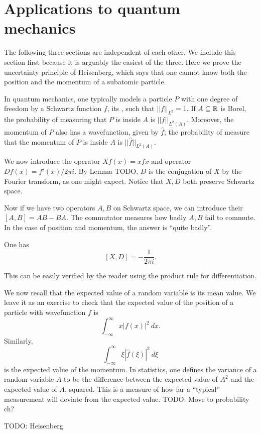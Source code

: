 \section{Applications to quantum mechanics}
The following three sections are independent of each other. We include this section first because it is arguably the easiest of the three.
Here we prove the uncertainty principle of Heisenberg, which says that one cannot know both the position and the momentum of a subatomic particle.

In quantum mechanics, one typically models a particle $P$ with one degree of freedom by a Schwartz function $f$, its , such that $||f||_{L^2} = 1$.
If $A \subseteq \mathbb{R}$ is Borel, the probability of measuring that $P$ is inside $A$ is $||f||_{L^2(A)}$.
Moreover, the momentum of $P$ also has a wavefunction, given by $\hat f$; the probability of measure that the momentum of $P$ is inside $A$ is $||\hat f||_{L^2(A)}$.

We now introduce the  operator $Xf(x) = xfx$ and  operator $Df(x) = f'(x)/2\pi i$. By Lemma TODO, $D$ is the conjugation of $X$ by the Fourier transform, as one might expect. Notice that $X,D$ both preserve Schwartz space.

Now if we have two operators $A,B$ on Schwartz space, we can introduce their  $[A,B] = AB - BA$. The commutator measures how badly $A,B$ fail to commute.
In the case of position and momentum, the answer is ``quite badly''.

\begin{theorem}
One has
\[[X, D] = -\frac{1}{2\pi i}.\]
\end{theorem}
This can be easily verified by the reader using the product rule for differentiation.

We now recall that the expected value of a random variable is its mean value. We leave it as an exercise to check that the expected value of the position of a particle with wavefunction $f$ is
\[\int_{-\infty}^{\infty} x|f(x)|^2~dx.\]
Similarly,
\[\int_{-\infty}^{\infty} \xi|\hat f(\xi)|^2~d\xi\]
is the expected value of the momentum.
In statistics, one defines the variance of a random variable $A$ to be the difference between the expected value of $A^2$ and the expected value of $A$, squared.
This is a measure of how far a ``typical'' measurement will deviate from the expected value.
TODO: Move to probability ch?

TODO: Heisenberg

